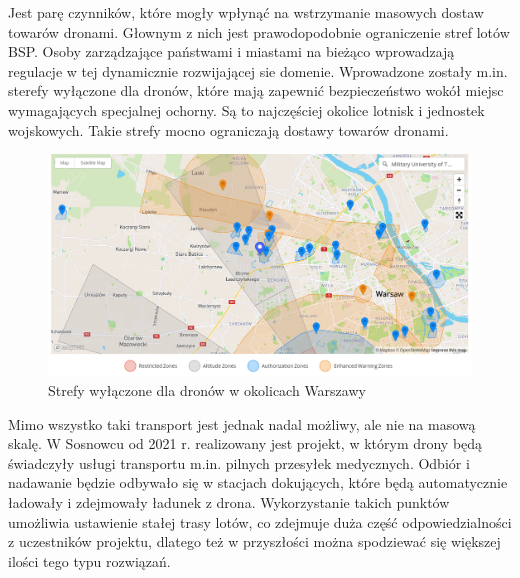 Jest parę czynników, które mogły wpłynąć na wstrzymanie masowych dostaw towarów dronami. Głownym z nich jest prawodopodobnie ograniczenie stref lotów BSP. Osoby zarządzające państwami i miastami na bieżąco wprowadzają regulacje w tej dynamicznie rozwijającej sie domenie. Wprowadzone zostały m.in. sterefy wyłączone dla dronów, które mają zapewnić bezpieczeństwo wokół miejsc wymagających specjalnej ochorny. Są to najczęściej okolice lotnisk i jednostek wojskowych. Takie strefy mocno ograniczają dostawy towarów dronami.\cite{drone-transport}


\begin{figure}[!ht]
  \centering
  \includegraphics[width=16cm]{./Obrazy/no2.png}
  \caption{Strefy wyłączone dla dronów w okolicach Warszawy}
  \end{figure}
  
Mimo wszystko taki transport jest jednak nadal możliwy, ale nie na masową skalę. W Sosnowcu od 2021 r. realizowany jest projekt, w którym drony będą świadczyły usługi transportu m.in. pilnych przesyłek medycznych. Odbiór i nadawanie będzie odbywało się w stacjach dokujących, które będą automatycznie ładowały i zdejmowały ładunek z drona. Wykorzystanie takich punktów umożliwia ustawienie stałej trasy lotów, co zdejmuje duża część odpowiedzialności z uczestników projektu, dlatego też w przyszłości można spodziewać się większej ilości tego typu rozwiązań.\cite{sosnowiec-drone}


